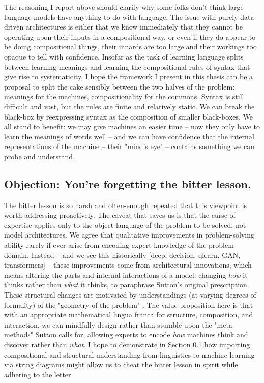 \begin{fullwidth}
The reasoning I report above should clarify why some folks don't think large language models have anything to do with language. The issue with purely data-driven architectures is either that we know immediately that they cannot be operating upon their inputs in a compositional way, or even if they do appear to be doing compositional things, their innards are too large and their workings too opaque to tell with confidence. Insofar as the task of learning language splits between learning meanings and learning the compositional rules of syntax that give rise to systematicity, I hope the framework I present in this thesis can be a proposal to split the cake sensibly between the two halves of the problem: meanings for the machines, compositionality for the commons. Syntax is still difficult and vast, but the rules are finite and relatively static. We can break the black-box by reexpressing syntax as the composition of smaller black-boxes. We all stand to benefit: we may give machines an easier time -- now they only have to learn the meanings of words well -- and we can have confidence that the internal representations of the machine -- their "mind's eye" -- contains something we can probe and understand.\\

\end{fullwidth}

\subsection{\textbf{Objection:} You're forgetting the bitter lesson.}

The bitter lesson is so harsh and often-enough repeated that this viewpoint is worth addressing proactively. The caveat that saves us is that the curse of expertise applies only to the object-language of the problem to be solved, not model architectures. We agree that qualitative improvements in problem-solving ability rarely if ever arise from encoding expert knowledge of the problem domain. Instead -- and we see this historically \citep{}[deep, decision, qlearn, GAN, transformers] -- these improvements come from architectural innovations, which means altering the parts and internal interactions of a model: changing \emph{how} it thinks rather than \emph{what} it thinks, to paraphrase Sutton's original prescription. These structural changes are motivated by understandings (at varying degrees of formality) of the "geometry of the problem" \citep{}. The value proposition here is that with an appropriate mathematical lingua franca for structure, composition, and interaction, we can mindfully design rather than stumble upon the "meta-methods" Sutton calls for, allowing experts to encode \emph{how} machines think and discover rather than \emph{what}. I hope to demonstrate in Section \ref{} how importing compositional and structural understanding from linguistics to machine learning via string diagrams might allow us to cheat the bitter lesson in spirit while adhering to the letter.

